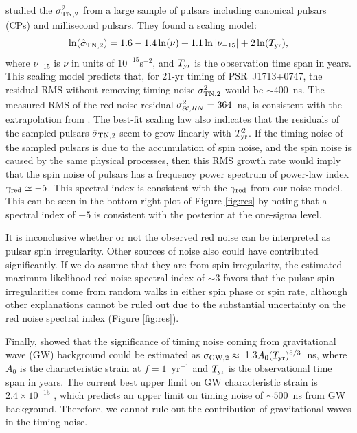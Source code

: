 \citet{sc10} studied the $\sigma^2_{\rm TN,2}$ from a large sample of pulsars
including canonical pulsars (CPs) and millisecond pulsars. They found a scaling
model:
\begin{equation}
\label{eq:sc10}
\ln(\hat{\sigma}_{\rm TN,2}) = 1.6 - 1.4\ln(\nu) +
1.1\ln|\dot{\nu}_{-15}|+2\ln(T_{\rm yr}),
\end{equation}
where $\dot{\nu}_{-15}$ is $\dot{\nu}$ in units of $10^{-15}$s$^{-2}$, and $T_{\rm yr}$
is the observation time span in years.
This scaling model predicts that, for 21-yr timing of PSR~J1713+0747, the
residual RMS without removing timing noise $\sigma^2_{\rm TN,2}$ would be
$\sim400$~ns. The measured RMS of the red noise residual 
$\sigma^2_{\mathscr{R},RN}=364$~ns, is consistent with the extrapolation
from \citet{sc10}.  
The best-fit scaling law also indicates that the residuals of the
sampled pulsars $\hat{\sigma}_{\rm TN,2}$ seem to grow linearly with $T_{\rm yr}^2$. 
If the timing noise of the sampled pulsars is due to the accumulation of 
spin noise, and the spin noise is caused by the same physical processes,
then this RMS growth rate would imply that the spin noise of pulsars has a
frequency power spectrum of power-law index $\gamma_{\rm red}\simeq -5$. This 
spectral index is consistent with the $\gamma_{\rm red}$
from our noise model. This can be seen in the bottom right plot of Figure \ref{fig:res} 
by noting that a spectral index of $-5$ is consistent with the posterior at the one-sigma
level. 

It is inconclusive whether or not the observed red noise can be interpreted as pulsar spin irregularity.
Other sources of noise also could have contributed significantly.
If we do assume that they are from spin irregularity, 
the estimated maximum likelihood red noise spectral index of $\sim3$ 
favors that the pulsar spin irregularities come from
random walks in either spin phase or spin rate, although other explanations cannot be ruled out due to the
substantial uncertainty on the red noise spectral index (Figure \ref{fig:res}).

Finally, \citet{sc10} showed that the significance of timing noise coming from
gravitational wave (GW) background could be estimated as
$\sigma_{\rm GW,2} \approx$~1.3$A_0(T_{\rm yr})^{5/3}$~ns, where $A_0$ is the
characteristic strain at $f=1$~yr$^{-1}$ and $T_{\rm yr}$ is the observational
time span in years. The current best upper limit on GW characteristic 
strain is $2.4\times10^{-15}$ \citep{src+13}, which predicts an upper limit on
timing noise of $\sim500$~ns from GW background. Therefore, we
cannot rule out the contribution of gravitational waves in the timing noise.


